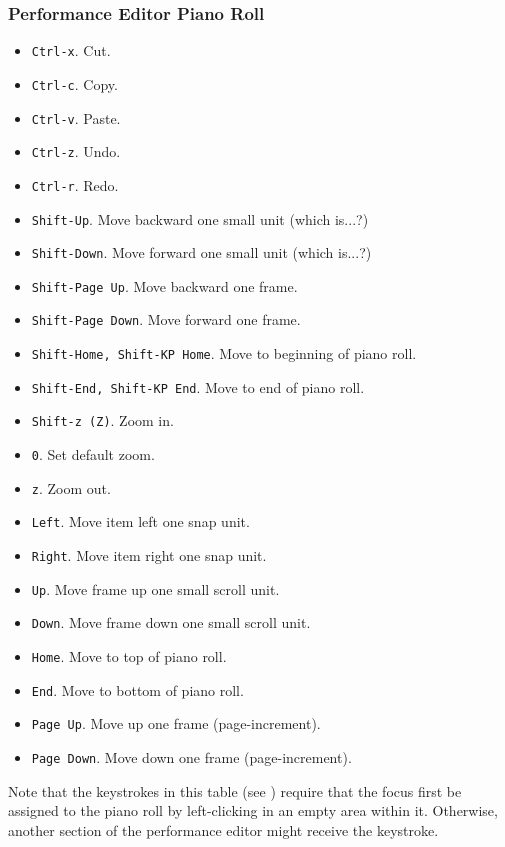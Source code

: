 \subsubsection{Performance Editor Piano Roll}
\label{subsubsec:kbd_mouse_performance_editor_piano_roll}

   \begin{itemize}
      \item \texttt{Ctrl-x}. Cut.
      \item \texttt{Ctrl-c}. Copy.
      \item \texttt{Ctrl-v}. Paste.
      \item \texttt{Ctrl-z}. Undo.
      \item \texttt{Ctrl-r}. Redo.
      \item \texttt{Shift-Up}.   Move backward one small unit (which is...?)
      \item \texttt{Shift-Down}.   Move forward one small unit (which is...?)
      \item \texttt{Shift-Page Up}.   Move backward one frame.
      \item \texttt{Shift-Page Down}.   Move forward one frame.
      \item \texttt{Shift-Home, Shift-KP Home}.  Move to beginning of piano roll.
      \item \texttt{Shift-End, Shift-KP End}.  Move to end of piano roll.
      \item \texttt{Shift-z (Z)}.  Zoom in.
      \item \texttt{0}.  Set default zoom.
      \item \texttt{z}.  Zoom out.
      \item \texttt{Left}.  Move item left one snap unit.
      \item \texttt{Right}.  Move item right one snap unit.
      \item \texttt{Up}.  Move frame up one small scroll unit.
      \item \texttt{Down}.  Move frame down one small scroll unit.
      \item \texttt{Home}.  Move to top of piano roll.
      \item \texttt{End}.  Move to bottom of piano roll.
      \item \texttt{Page Up}.  Move up one frame (page-increment).
      \item \texttt{Page Down}.  Move down one frame (page-increment).
   \end{itemize}

   Note that the keystrokes in this table
   (see )
   require that the focus first be
   assigned to the piano roll by left-clicking in an empty area within it.
   Otherwise, another section of the performance editor might receive the
   keystroke.

